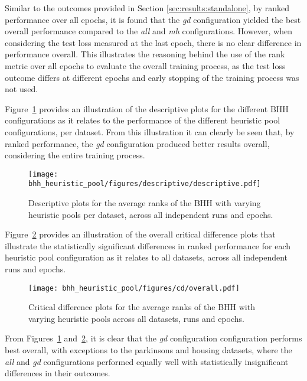 Similar to the outcomes provided in Section \ref{sec:results:standalone}, by ranked performance over all epochs, it is found that the \textit{gd} configuration yielded the best overall performance compared to the \textit{all} and \textit{mh} configurations. However, when considering the test loss measured at the last epoch, there is no clear difference in performance overall. This illustrates the reasoning behind the use of the rank metric over all epochs to evaluate the overall training process, as the test loss outcome differs at different epochs and early stopping of the training process was not used.

Figure~\ref{fig:results:heuristic_pool:descriptive:descriptive} provides an illustration of the descriptive plots for the different \acs{BHH} configurations as it relates to the performance of the different heuristic pool configurations, per dataset. From this illustration it can clearly be seen that, by ranked performance, the \textit{gd} configuration produced better results overall, considering the entire training process.

\begin{figure}[htb]
      \centering
      \texttt{[image: bhh\_heuristic\_pool/figures/descriptive/descriptive.pdf]}
      \caption{Descriptive plots for the average ranks of the \acs{BHH} with varying heuristic pools per dataset, across all independent runs and epochs.}
      \label{fig:results:heuristic_pool:descriptive:descriptive}
\end{figure}

Figure~\ref{fig:results:heuristic_pool:descriptive:cd} provides an illustration of the overall critical difference plots that illustrate the statistically significant differences in ranked performance for each heuristic pool configuration as it relates to all datasets, across all independent runs and epochs.

\begin{figure}[htb]
      \centering
      \texttt{[image: bhh\_heuristic\_pool/figures/cd/overall.pdf]}
      \caption{Critical difference plots for the average ranks of the \acs{BHH} with varying heuristic pools across all datasets, runs and epochs.}
      \label{fig:results:heuristic_pool:descriptive:cd}
\end{figure}

From Figures~\ref{fig:results:heuristic_pool:descriptive:descriptive} and~\ref{fig:results:heuristic_pool:descriptive:cd}, it is clear that the \textit{gd} configuration configuration performs best overall, with exceptions to the parkinsons and housing datasets, where the \textit{all} and \textit{gd} configurations performed equally well with statistically insignificant differences in their outcomes.

